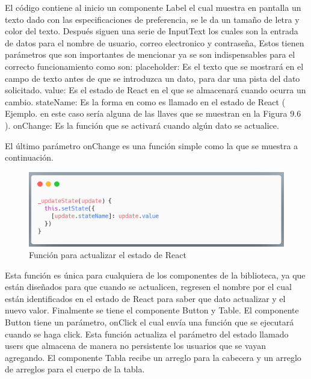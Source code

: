 El código contiene al inicio un componente Label el cual muestra en pantalla un texto dado con las especificaciones de preferencia, se le da un tamaño de letra y color del texto. Después siguen una serie de InputText los cuales son la entrada de datos para el nombre de usuario, correo electronico  y contraseña, Estos tienen parámetros que son importantes de mencionar ya se son indispensables para el correcto funcionamiento como son:
placeholder: Es el texto que se mostrará en el campo de texto antes de que se introduzca un dato, para dar una pista del dato solicitado.
value: Es el estado de React en el que se almacenará cuando ocurra un cambio.
stateName: Es la forma en como es llamado en el estado de React ( Ejemplo. en este caso sería alguna de las llaves que se muestran en la Figura 9.6 ).
onChange: Es la función que se activará cuando algún dato se actualice.

El último parámetro onChange es una función simple como la que se muestra a continuación. 

\newline
\begin{figure}[H]
    \includegraphics[width=1\textwidth]{./Imagenes/9.9}
   \centering 
    \caption[Función para actualizar el estado de React]{Función para actualizar el estado de React}
    \end{figure}
\newline

Esta función es única para cualquiera de los componentes de la biblioteca, ya que están diseñados para que cuando se actualicen, regresen el nombre por el cual están identificados en el estado de React para saber que dato actualizar  y el nuevo valor.
Finalmente se tiene el componente Button y Table. El componente Button tiene un parámetro, onClick el cual envía una función que se ejecutará cuando se haga click. Esta función actualiza el parámetro del estado llamado users que almacena de manera no persistente los usuarios que se vayan agregando.
El componente Tabla recibe un arreglo para la cabecera y un arreglo de arreglos para el cuerpo de la tabla.


